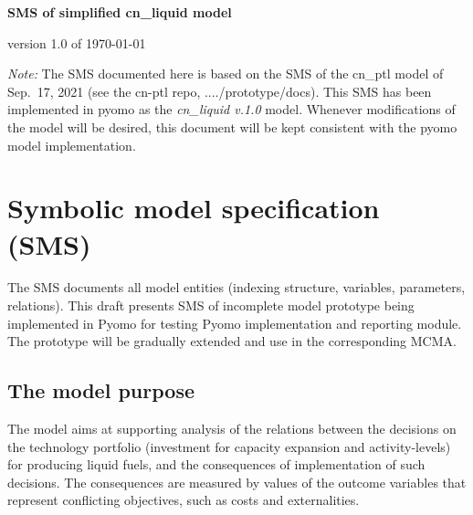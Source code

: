 \documentclass[a4paper,12pt]{article}
\begin{document}
\centerline{\Large\bf SMS of simplified cn\_liquid model}
\bigskip

\centerline{\sc version 1.0 of \today}

\bigskip
\bigskip

\linenumbers

{\em Note:} The SMS documented here is based on the SMS of the cn\_ptl model of
Sep.~17, 2021 (see the cn-ptl repo, ..../prototype/docs).
This SMS has been implemented in pyomo as the {\em cn\_liquid v.1.0} model.
Whenever modifications of the model will be desired, this document will be kept
consistent with the pyomo model implementation.

\section{Symbolic model specification (SMS)}
The SMS documents all model entities (indexing structure, variables,
parameters, relations).
This draft presents SMS of incomplete model prototype being implemented in Pyomo
for testing Pyomo implementation and reporting module.
The prototype will be gradually extended and use in the corresponding MCMA.

\subsection{The model purpose}
The model aims at supporting analysis of the relations between the decisions
on the technology portfolio (investment for capacity expansion and activity-levels)
for producing liquid fuels, and the consequences of implementation of such decisions.
The consequences are measured by values of the outcome variables that represent
conflicting objectives, such as costs and externalities.
\end{document}
